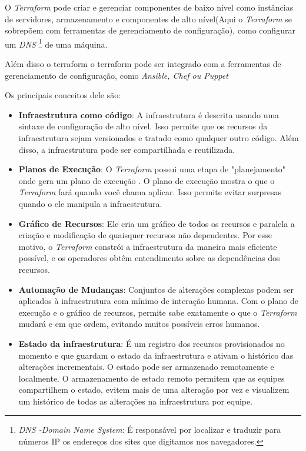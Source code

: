 O \textit{Terraform} pode criar e gerenciar componentes de baixo nível como instâncias de servidores, armazenamento e componentes de alto nível(Aqui o \textit{Terraform} se sobrepõem com ferramentas de gerenciamento de configuração), como configurar um \textit{DNS} \footnote{\textit{DNS -Domain Name System}: É responsável por localizar e traduzir para números IP os endereços dos sites que digitamos nos navegadores.} de uma máquina.

Além disso o terraform o terraform pode ser integrado com a ferramentas de gerenciamento de configuração, como \textit{Ansible, Chef ou Puppet}

Os principais conceitos dele são:
 \begin{itemize}
\item \textbf{Infraestrutura como código}: A infraestrutura é descrita usando uma sintaxe de configuração de alto nível. Isso permite que os recursos da infraestrutura sejam versionados e tratado como qualquer outro código. Além disso, a infraestrutura pode ser compartilhada e reutilizada.

\item \textbf{Planos de Execução}: O \textit{Terraform} possui uma etapa de "planejamento" onde gera um plano de execução . O plano de execução mostra o que o \textit{Terraform} fará quando você chama aplicar. Isso permite evitar surpresas quando o ele manipula a infraestrutura.

\item \textbf{Gráfico de Recursos}: Ele cria um gráfico de todos os recursos e paralela a criação e modificação de quaisquer recursos não dependentes. Por esse motivo, o \textit{Terraform} constrói a infraestrutura da maneira mais eficiente possível, e os operadores obtêm entendimento sobre as dependências dos recursos.

\item \textbf{Automação de Mudanças}: Conjuntos de alterações complexas podem ser aplicados à infraestrutura com mínimo de interação humana. Com o plano de execução e o gráfico de recursos, permite sabe exatamente o que o \textit{Terraform} mudará e em que ordem, evitando muitos possíveis erros humanos.

\item \textbf{Estado da infraestrutura}: É um registro dos recursos provisionados no momento e que guardam o estado da infraestrutura e ativam o histórico das alterações incrementais. O estado pode ser armazenado remotamente e localmente. O armazenamento de estado remoto permitem que as equipes compartilhem o estado, evitem mais de uma alteração por vez e visualizem um histórico de todas as alterações na infraestrutura por equipe.


\end{itemize}
